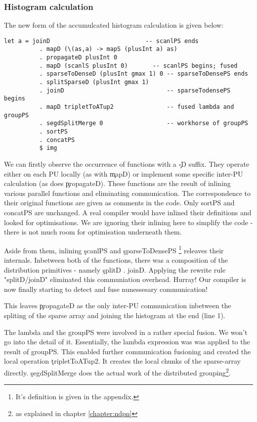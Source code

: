     \subsubsection{Histogram calculation}
      The new form of the accumulcated histogram calculation is given below:
      \begin{lstlisting}
let a = joinD                           -- scanlPS ends
          . mapD (\(as,a) -> mapS (plusInt a) as)
          . propagateD plusInt 0
          . mapD (scanlS plusInt 0)       -- scanlPS begins; fused
          . sparseToDenseD (plusInt gmax 1) 0 -- sparseToDensePS ends
          . splitSparseD (plusInt gmax 1)     
          . joinD                             -- sparseTodensePS begins
          . mapD tripletToATup2               -- fused lambda and groupPS 
          . segdSplitMerge 0                  -- workhorse of groupPS
          . sortPS
          . concatPS
          $ img
      \end{lstlisting}
      We can firstly observe the occurrence of functions with a \c{-D} suffix. They operate either
      on each PU locally (as with \c{mapD}) or implement some specific inter-PU calculation (as does \c{propagateD}).
      These functions are the result of inlining various parallel functions and eliminating communication.
      The correspondence to their original functions are given as comments in the code. Only sortPS and concatPS
      are unchanged. A real compiler would have inlined their definitions and looked for optimisations.
      We are ignoring their inlining here to simplify the code - there is not much room for optimisation underneath them.
      
      
      Aside from them, inlining \c{scanlPS} and \c{sparseToDensePS}
      \footnote{It's definition is given in the appendix.} releaves their internals.
      Inbetween both of the functions, there was a composition of the distribution primitives - namely \c{splitD . joinD}.
      Applying the rewrite rule "splitD/joinD" eliminated this communiation overhead. Hurray! Our compiler
      is now finally starting to detect and fuse nunessesary communication!
      
      This leaves \c{propagateD} as the only inter-PU communication inbetween the spliting of the
      sparse array and joining the histogram at the end (line 1).
      
      The lambda and the groupPS were involved in a rather special fusion. We won't
      go into the detail of it. Essentially, the lambda expression was
      was applied to the result of groupPS. This enabled further communication
      fusioning and created the local operation \c{tripletToATup2}. It creates the
      local chunks of the sparse-array directly. \c{segdSplitMerge} does the
      actual work of the distributed grouping\footnote{as explained in chapter \ref{chapter:ndpn}}.
      
